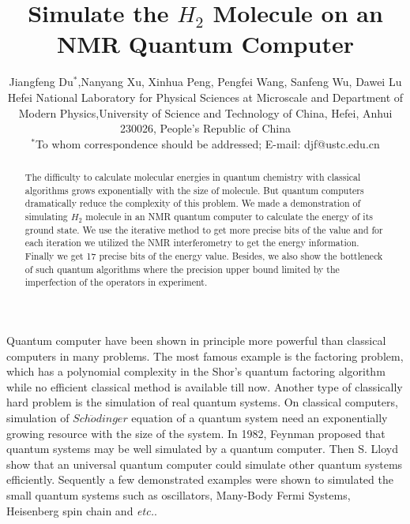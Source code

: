 \def\CTeXPreproc{Created by ctex v0.2.12, don't edit!}\documentclass[twocolumn,showpacs,twoside,10pt,superscriptaddress,prl]{revtex4}
\begin{document}
\title{Simulate the $H_2$ Molecule on an NMR Quantum Computer}
\author{Jiangfeng Du$^{\ast}$,Nanyang Xu, Xinhua Peng, Pengfei Wang, Sanfeng Wu, Dawei Lu \\
\normalsize{Hefei National Laboratory for Physical Sciences at
Microscale and Department of Modern
Physics,University of Science and Technology of China, Hefei, Anhui 230026, People's Republic of China}\\
\normalsize{$^\ast$To whom correspondence should be addressed;
E-mail:  djf@ustc.edu.cn}}



\begin{abstract}
The difficulty to calculate molecular energies in quantum chemistry
with classical algorithms grows exponentially with the size of
molecule. But quantum computers dramatically reduce the complexity
of this problem. We made a demonstration of simulating $H_2$
molecule in an NMR quantum computer to calculate the energy of its
ground state. We use the iterative method to get more precise bits
of the value and for each iteration we utilized the NMR
interferometry to get the energy information. Finally we get 17
precise bits of the energy value. Besides, we also show the
bottleneck of such quantum algorithms where the precision upper
bound limited by the imperfection of the operators in experiment.

\end{abstract}
\maketitle

Quantum computer have been shown in principle more powerful than
classical computers in many problems. The most famous example is the
factoring problem, which has a polynomial complexity in the Shor's
quantum factoring algorithm\cite{shor_algorithm} while no efficient
classical method is available till now\cite{knuth}. Another type of
classically hard problem is the simulation of real quantum
systems\cite{lloyld_univsim}. On classical computers, simulation of
$Sch\ddot{o}dinger$ equation of a quantum system need an
exponentially growing resource with the size of the system. In 1982,
Feynman proposed that quantum systems may be well simulated by a
quantum computer\cite{feynman}. Then S. Lloyd show that an universal
quantum computer could simulate other quantum systems efficiently.
Sequently a few demonstrated examples were shown to simulated the
small quantum systems such as oscillators\cite{oscillator},
Many-Body Fermi Systems\cite{manybody}, Heisenberg spin
chain\cite{peng2005} and \emph{etc.}.
\end{document}
